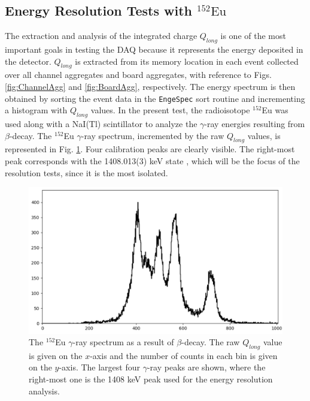 \subsection{Energy Resolution Tests with $^{152}\mathrm{Eu}$} \label{subsec:energy_resolution}

The extraction and analysis of the integrated charge $Q_{long}$ is one of the most important goals in testing the DAQ because it represents the energy deposited in the detector. $Q_{long}$ is extracted from its memory location in each event collected over all channel aggregates and board aggregates, with reference to Figs. \ref{fig:ChannelAgg} and \ref{fig:BoardAgg}, respectively. The energy spectrum is then obtained by sorting the event data in the \texttt{EngeSpec} sort routine and incrementing a histogram with $Q_{long}$ values. In the present test, the radioisotope $^{152}$Eu was used along with a NaI(Tl) scintillator to analyze the $\gamma$-ray energies resulting from $\beta$-decay. The $^{152}$Eu $\gamma$-ray spectrum, incremented by the raw $Q_{long}$ values, is represented in Fig. \ref{fig:Eu152_spectrum}. Four calibration peaks are clearly visible. The right-most peak corresponds with the 1408.013(3) keV state \cite{IAEA2007}, which will be the focus of the resolution tests, since it is the most isolated. 

\begin{figure}[t]
\centering
\includegraphics[width=6.5in]{Chapter-5/figs/Eu152_Spectrum.png}
\caption{\label{fig:Eu152_spectrum}The $^{152}$Eu $\gamma$-ray spectrum as a result of $\beta$-decay. The raw $Q_{long}$ value is given on the $x$-axis and the number of counts in each bin is given on the $y$-axis. The largest four $\gamma$-ray peaks are shown, where the right-most one is the 1408 keV peak used for the energy resolution analysis.}
\end{figure}


